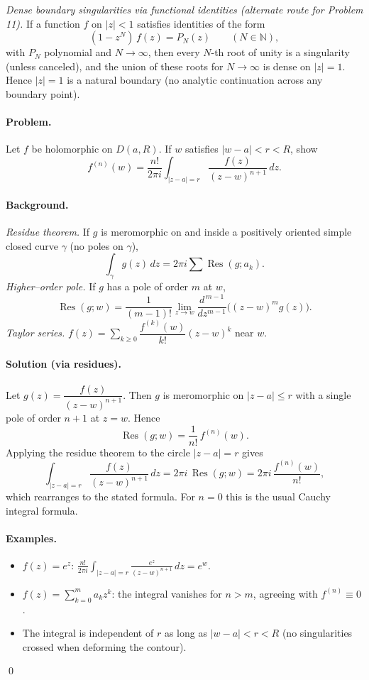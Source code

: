 \documentclass[11pt,a4paper]{article}
\theoremstyle{definition}
\theoremstyle{definition}
\theoremstyle{plain}
\theoremstyle{remark}
\DeclareMathOperator{\Res}{Res}
\begin{document}
\medskip
\emph{Dense boundary singularities via functional identities (alternate route for Problem 11).}
If a function $f$ on $|z|<1$ satisfies identities of the form
\[
(1-z^{N})\,f(z)=P_N(z)\qquad (N\in\mathbb N),
\]
with $P_N$ polynomial and $N\to\infty$, then every $N$-th root of unity
is a singularity (unless canceled), and the union of these roots for $N\to\infty$ is dense on $|z|=1$.
Hence $|z|=1$ is a natural boundary (no analytic continuation across any boundary point).

\paragraph{Problem.}
Let $f$ be holomorphic on $D(a,R)$. If $w$ satisfies $|w-a|<r<R$, show
\[
f^{(n)}(w)=\frac{n!}{2\pi i}\int_{|z-a|=r}\frac{f(z)}{(z-w)^{n+1}}\,dz.
\]

\paragraph{Background.}
\emph{Residue theorem.} If $g$ is meromorphic on and inside a positively oriented simple closed curve $\gamma$ (no poles on $\gamma$),
\[
\int_\gamma g(z)\,dz = 2\pi i \sum \Res(g;a_k).
\]
\emph{Higher–order pole.} If $g$ has a pole of order $m$ at $w$,
\[
\Res(g;w)=\frac{1}{(m-1)!}\lim_{z\to w}\frac{d^{\,m-1}}{dz^{m-1}}\Big((z-w)^m g(z)\Big).
\]
\emph{Taylor series.} $f(z)=\sum_{k\ge0}\dfrac{f^{(k)}(w)}{k!}(z-w)^k$ near $w$.

\medskip
\paragraph{Solution (via residues).}
Let $g(z)=\dfrac{f(z)}{(z-w)^{n+1}}$. Then $g$ is meromorphic on $|z-a|\le r$ with a single pole of order $n+1$ at $z=w$.
Hence
\[
\Res(g;w)=\frac{1}{n!}\,f^{(n)}(w).
\]
Applying the residue theorem to the circle $|z-a|=r$ gives
\[
\int_{|z-a|=r}\frac{f(z)}{(z-w)^{n+1}}\,dz
= 2\pi i\,\Res(g;w)
= 2\pi i\,\frac{f^{(n)}(w)}{n!},
\]
which rearranges to the stated formula. For $n=0$ this is the usual Cauchy integral formula.

\medskip
\paragraph{Examples.}
\begin{itemize}
	\item $f(z)=e^{z}$: $\displaystyle \frac{n!}{2\pi i}\int_{|z-a|=r}\frac{e^{z}}{(z-w)^{n+1}}\,dz=e^{w}$.
	\item $f(z)=\sum_{k=0}^{m}a_k z^k$: the integral vanishes for $n>m$, agreeing with $f^{(n)}\equiv 0$.
	\item The integral is independent of $r$ as long as $|w-a|<r<R$ (no singularities crossed when deforming the contour).
\end{itemize}
\qed
\end{document}
